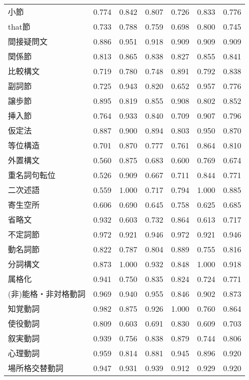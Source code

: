 \begin{table}[H]
\begin{tabular}{lcccccc}
    小節 & 0.774 & 0.842 & 0.807 & 0.726 & 0.833 & 0.776 \\
    that節 & 0.733 & 0.788 & 0.759 & 0.698 & 0.800 & 0.745 \\
    間接疑問文 & 0.886 & 0.951 & 0.918 & 0.909 & 0.909 & 0.909 \\
    関係節 & 0.813 & 0.865 & 0.838 & 0.827 & 0.855 & 0.841 \\
    比較構文 & 0.719 & 0.780 & 0.748 & 0.891 & 0.792 & 0.838 \\
    副詞節 & 0.725 & 0.943 & 0.820 & 0.652 & 0.957 & 0.776 \\
    譲歩節 & 0.895 & 0.819 & 0.855 & 0.908 & 0.802 & 0.852 \\
    挿入節 & 0.764 & 0.933 & 0.840 & 0.709 & 0.907 & 0.796 \\
    仮定法 & 0.887 & 0.900 & 0.894 & 0.803 & 0.950 & 0.870 \\
    等位構造 & 0.701 & 0.870 & 0.777 & 0.761 & 0.864 & 0.810 \\
    外置構文 & 0.560 & 0.875 & 0.683 & 0.600 & 0.769 & 0.674 \\
    重名詞句転位 & 0.526 & 0.909 & 0.667 & 0.711 & 0.844 & 0.771 \\
    二次述語 & 0.559 & 1.000 & 0.717 & 0.794 & 1.000 & 0.885 \\
    寄生空所 & 0.606 & 0.690 & 0.645 & 0.758 & 0.625 & 0.685 \\
    省略文 & 0.932 & 0.603 & 0.732 & 0.864 & 0.613 & 0.717 \\
    不定詞節 & 0.972 & 0.921 & 0.946 & 0.972 & 0.921 & 0.946 \\
    動名詞節 & 0.822 & 0.787 & 0.804 & 0.889 & 0.755 & 0.816 \\
    分詞構文 & 0.873 & 1.000 & 0.932 & 0.848 & 1.000 & 0.918 \\
    属格化 & 0.941 & 0.750 & 0.835 & 0.824 & 0.724 & 0.771 \\
    (非)能格・非対格動詞 & 0.969 & 0.940 & 0.955 & 0.846 & 0.902 & 0.873 \\
    知覚動詞 & 0.982 & 0.875 & 0.926 & 1.000 & 0.760 & 0.864 \\
    使役動詞 & 0.809 & 0.603 & 0.691 & 0.830 & 0.609 & 0.703 \\
    叙実動詞 & 0.939 & 0.756 & 0.838 & 0.879 & 0.744 & 0.806 \\
    心理動詞 & 0.959 & 0.814 & 0.881 & 0.945 & 0.896 & 0.920 \\
    場所格交替動詞 & 0.947 & 0.931 & 0.939 & 0.912 & 0.929 & 0.920 \\

\end{tabular}
\end{table}
